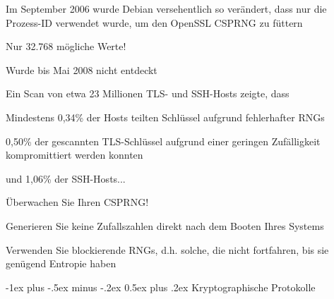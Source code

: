 \documentclass[a4paper]{article}
\makeatletter
\renewcommand{\section}{\@startsection{section}{1}{0mm}%
 {-1ex plus -.5ex minus -.2ex}%
 {0.5ex plus .2ex}%
 {\normalfont\large\bfseries}}
\makeatother
\begin{document}
\begin{multicols}{3}
      \begin{itemize*}
            \item Im September 2006 wurde Debian versehentlich so verändert, dass nur
            die Prozess-ID verwendet wurde, um den OpenSSL CSPRNG zu füttern
            \begin{itemize*}
                  \item Nur 32.768 mögliche Werte!
                  \item Wurde bis Mai 2008 nicht entdeckt
            \end{itemize*}
            \item Ein Scan von etwa 23 Millionen TLS- und SSH-Hosts zeigte, dass
            \begin{itemize*}
                  \item Mindestens 0,34\% der Hosts teilten Schlüssel aufgrund fehlerhafter RNGs
                  \item 0,50\% der gescannten TLS-Schlüssel aufgrund einer geringen Zufälligkeit kompromittiert werden konnten
                  \item und 1,06\% der SSH-Hosts...
            \end{itemize*}
            \item Überwachen Sie Ihren CSPRNG!
            \begin{itemize*}
                  \item Generieren Sie keine Zufallszahlen direkt nach dem Booten Ihres Systems
                  \item Verwenden Sie blockierende RNGs, d.h. solche, die nicht fortfahren, bis sie genügend Entropie haben
            \end{itemize*}
      \end{itemize*}


      \section{Kryptographische
        Protokolle}


\end{multicols}
\end{document}
